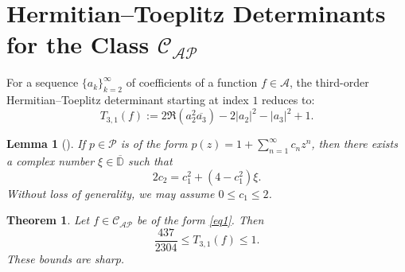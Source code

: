 \documentclass[10pt,a4paper]{amsart}
\newtheorem{theo}{Theorem}[section]
\newtheorem{lem}{Lemma}[section]
\newcommand{\ol}{\overline}
\numberwithin{equation}{section}
\begin{document}
\section{Hermitian--Toeplitz Determinants for the Class $\mathcal{C}_{\mathcal{AP}}$}
For a sequence $\{a_k\}_{k=2}^{\infty}$ of coefficients of a function $f \in \mathcal{A}$, the third-order Hermitian--Toeplitz determinant starting at index $1$ reduces to:
\begin{equation}\label{po18}
T_{3,1}(f) := 2\Re\left(a_{2}^{2}\overline{a_{3}}\right) - 2|a_{2}|^{2} - |a_{3}|^{2} + 1.
\end{equation}

\begin{lem}[\cite{LZ}]\label{lem_LZ}
If $p \in \mathcal{P}$ is of the form $p(z) = 1 + \sum_{n=1}^{\infty} c_n z^n$, then there exists a complex number $\xi \in \ol{\mathbb{D}}$ such that
\begin{equation}\label{po19}
2c_{2} = c_{1}^{2} + (4 - c_{1}^{2})\xi.
\end{equation}
Without loss of generality, we may assume $0 \le c_1 \le 2$.
\end{lem}

\begin{theo}\label{T5}
Let $f \in \mathcal{C}_{\mathcal{AP}}$ be of the form \eqref{eq1}. Then
\[
\frac{437}{2304} \le T_{3,1}(f) \le 1.
\]
These bounds are sharp.
\end{theo}
\end{document}

